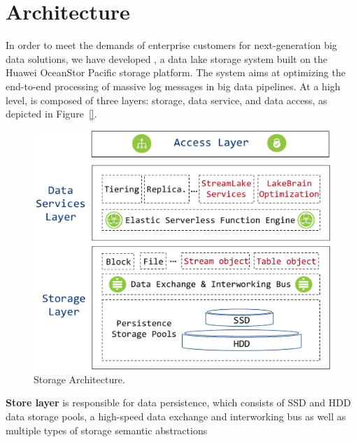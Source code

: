 \section{Architecture} 
\label{sec:archi}


In order to meet the demands of enterprise customers for next-generation big data solutions, we have developed \sys, a data lake storage system built on the Huawei OceanStor Pacific storage platform. The system aims at optimizing the end-to-end processing of massive log messages in big data pipelines. At a high level, \sys is composed of three layers: storage, data service, and data access, as depicted in Figure~\ref{}.



\begin{figure}[!t]
	\centering
	\includegraphics[scale=0.35]{figures/archi}
	\vspace{-1em}
	\caption{\sys Storage Architecture.}
	\label{fig:archi}
\end{figure}

\noindent \textbf{Store layer} is responsible for data persistence, which consists of SSD and HDD data storage pools, a high-speed data exchange and interworking bus as well as multiple types of storage semantic abstractions 


